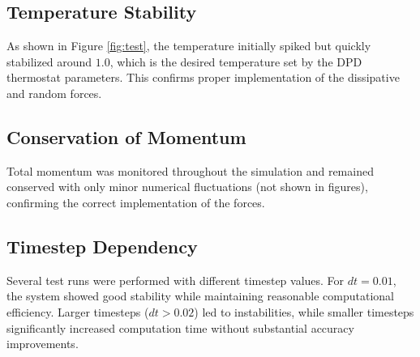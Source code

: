 \subsection{Temperature Stability}
As shown in Figure \ref{fig:test}, the temperature initially spiked but quickly stabilized around $1.0$, which is the desired temperature set by the DPD thermostat parameters. This confirms proper implementation of the dissipative and random forces.
\subsection{Conservation of Momentum}
Total momentum was monitored throughout the simulation and remained conserved with only minor numerical fluctuations (not shown in figures), confirming the correct implementation of the forces.
\subsection{Timestep Dependency}
Several test runs were performed with different timestep values. For $dt = 0.01$, the system showed good stability while maintaining reasonable computational efficiency. Larger timesteps ($dt > 0.02$) led to instabilities, while smaller timesteps significantly increased computation time without substantial accuracy improvements.

